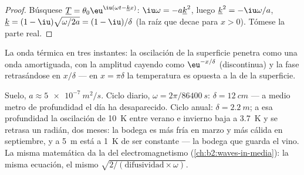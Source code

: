 \begin{proof}
Búsquese $\underline T = \theta_0\eu^{\iu(\omega t - \underline k x)}$:
$\iu\omega = -a\underline k^2$, luego $\underline k^2 = -\iu\omega/a$,
$\underline k = (1 - \iu)\sqrt{\omega/2a} = (1 - \iu)/\delta$ (la raíz
que decae para $x > 0$). Tómese la parte real.
\end{proof}

\begin{omfigure}

{\small La onda térmica en tres instantes: la oscilación de la superficie
penetra como una onda amortiguada, con la amplitud cayendo como $\eu^{-x/\delta}$
(discontinua) y la fase retrasándose en $x/\delta$ --- en $x = \pi\delta$ la
temperatura es opuesta a la de la superficie.}
\end{omfigure}

\begin{example}\label{ex:b2:heat-conduction:soil}
Suelo, $a \approx \qty{5e-7}{m^2/s}$. Ciclo diario, $\omega = 2\pi/\qty{86400}{s}$:
$\delta = \qty{12}{cm}$ --- a medio metro de profundidad el día ha desaparecido. Ciclo anual:
$\delta = \qty{2.2}{m}$; a esa profundidad la oscilación de \qty{10}{K} entre verano e invierno
baja a \qty{3.7}{K} y se retrasa un radián, dos meses: la bodega es
más fría en marzo y más cálida en septiembre, y a \qty{5}{m} está a
\qty{1}{K} de ser constante --- la bodega que guarda el vino. La misma
matemática da la  del electromagnetismo
(\cref{ch:b2:waves-in-media}): la misma ecuación, el mismo $\sqrt{2/(\text{difusividad}
\times\omega)}$.
\end{example}

